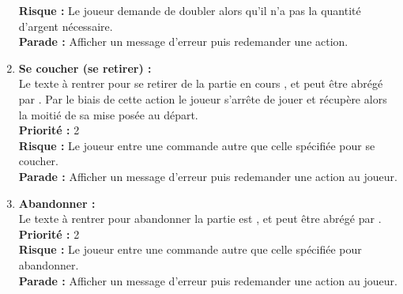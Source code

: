 \begin{enumerate}
    \textbf{Risque :} Le joueur demande de doubler alors qu'il n'a pas la quantité d'argent nécessaire.  \\
    \textbf{Parade :} Afficher un message d'erreur puis redemander une action.\\
    \item \textbf {Se coucher (se retirer) :} \\
    Le texte à rentrer pour se retirer de la partie en cours , et peut être abrégé par . Par le biais de cette action le joueur s'arrête de jouer et récupère alors la moitié de sa mise posée au départ. \\
    \textbf{Priorité :} 2 \\
    \textbf{Risque :} Le joueur entre une commande autre que celle spécifiée pour se coucher. \\
    \textbf{Parade :} Afficher un message d'erreur puis redemander une action au joueur.\\
    \item \textbf {Abandonner :} \\
    Le texte à rentrer pour abandonner la partie est , et peut être abrégé par . \\
    \textbf{Priorité :} 2 \\
    \textbf{Risque :} Le joueur entre une commande autre que celle spécifiée pour abandonner. \\
    \textbf{Parade :} Afficher un message d'erreur puis redemander une action au joueur.\\
\end{enumerate}


